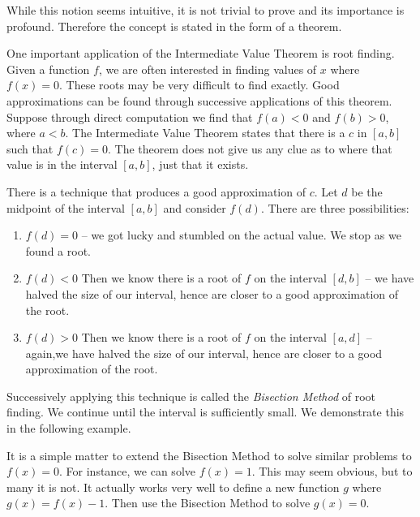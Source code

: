 While this notion seems intuitive, it is not trivial to prove and its importance is profound. Therefore the concept is stated in the form of a theorem.


One important application of the Intermediate Value Theorem is root finding. Given a function $f$, we are often interested in finding values of $x$ where $f(x) = 0$. These roots may be very difficult to find exactly. Good approximations can be found through successive applications of this theorem. Suppose through direct computation we find that $f(a) <0 $ and $f(b)>0$, where $a<b$. The Intermediate Value Theorem states that there is a $c$ in $[a,b]$ such that $f(c) = 0$. The theorem does not give us any clue as to where that value is in the interval $[a,b]$, just that it exists. 

There is a technique that produces a good approximation of $c$. Let $d$ be the midpoint of the interval $[a,b]$ and consider $f(d)$. There are three possibilities:
\begin{enumerate}[1)]
\item $f(d) = 0$ -- we got lucky and stumbled on the actual value. We stop as we found a root.
\item $f(d) <0$ Then we know there is a root of $f$ on the interval $[d,b]$ -- we have halved the size of our interval, hence are closer to a good approximation of the root.
\item $f(d) >0$ Then we know there is a root of $f$ on the interval $[a,d]$ -- again,we have halved the size of our interval, hence are closer to a good approximation of the root.
\end{enumerate}
	
Successively applying this technique is called the \emph{Bisection Method}  of root finding. We continue until the interval is sufficiently small. We demonstrate this in the following example.


It is a simple matter to extend the Bisection Method to solve similar problems to $f(x) = 0$. For instance, we can solve $f(x) = 1$. This may seem obvious, but to many it is not. It actually works very well to define a new function $g$ where $g(x) = f(x) - 1$. Then use the Bisection Method to solve $g(x)=0$.  

